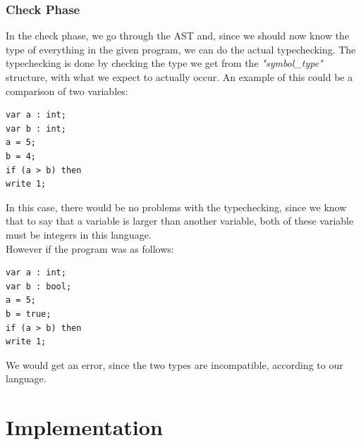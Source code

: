 \documentclass[a4paper,10pt,titlepage]{report}
\begin{document}
\subsubsection{Check Phase}
In the check phase, we go through the AST and, since we should now know the type of everything in the given program, we can do the actual typechecking. The typechecking is done by checking the type we get from the \textit{"symbol\_type"} structure, with what we expect to actually occur. An example of this could be a comparison of two variables:
\begin{lstlisting}
var a : int;
var b : int;
a = 5;
b = 4;
if (a > b) then
write 1;
\end{lstlisting}
In this case, there would be no problems with the typechecking, since we know that to say that a variable is larger than another variable, both of these variable must be integers in this language.\\
However if the program was as follows:
\begin{lstlisting}
var a : int;
var b : bool;
a = 5;
b = true;
if (a > b) then
write 1;
\end{lstlisting}
We would get an error, since the two types are incompatible, according to our language.

\section{Implementation}
\end{document}
